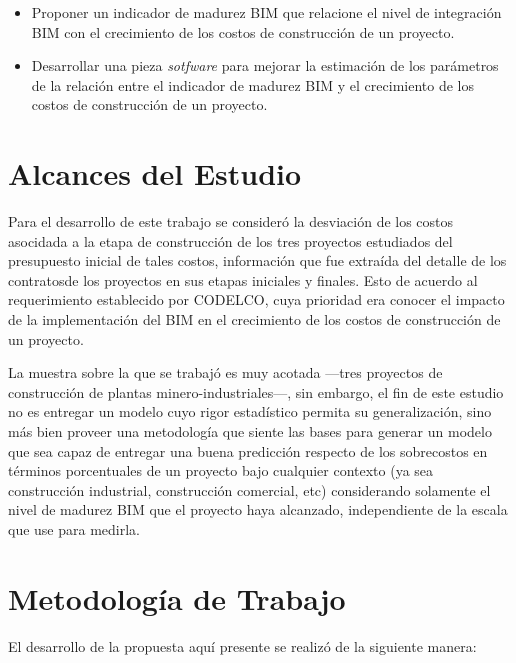 \begin{itemize}
    \item Proponer un indicador de madurez BIM que relacione el nivel de integración BIM con el crecimiento de los costos de construcción de un proyecto.
    \item Desarrollar una pieza \emph{sotfware} para mejorar la estimación de los parámetros de la relación entre el indicador de madurez BIM y el crecimiento de los costos de construcción de un proyecto.
\end{itemize}

\section{Alcances del Estudio}

Para el desarrollo de este trabajo se consideró la desviación de los costos asocidada a la etapa de construcción de los tres proyectos estudiados del presupuesto inicial de tales costos, información que fue extraída del detalle de los contratosde los proyectos en sus etapas iniciales y finales. Esto de acuerdo al requerimiento establecido por CODELCO, cuya prioridad era conocer el impacto de la implementación del BIM en el crecimiento de los costos de construcción de un proyecto.

La muestra sobre la que se trabajó es muy acotada ---tres proyectos de construcción de plantas minero-industriales---, sin embargo, el fin de este estudio no es entregar un modelo cuyo rigor estadístico permita su generalización, sino más bien proveer una metodología que siente las bases para generar un modelo que sea capaz de entregar una buena predicción respecto de los sobrecostos en términos porcentuales de un proyecto bajo cualquier contexto (ya sea construcción industrial, construcción comercial, etc) considerando solamente el nivel de madurez BIM que el proyecto haya alcanzado, independiente de la escala que use para medirla.



\section{Metodología de Trabajo}

El desarrollo de la propuesta aquí presente se realizó de la siguiente manera:

